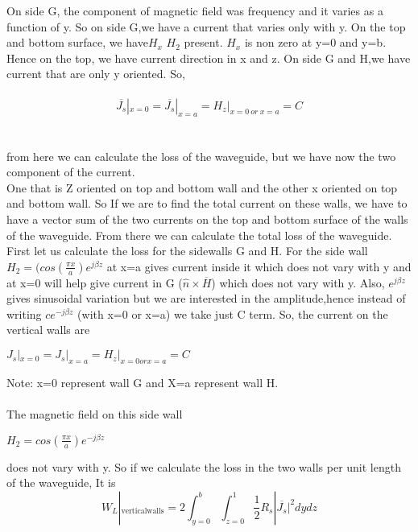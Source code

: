 On side G, the component of magnetic field was frequency and it varies as a function  of y. So on side G,we have a current that varies only with y. On the top and bottom  surface, we have$H_x$ $H_2$ present. 
$H_x$ is non zero at y=0 and y=b.
Hence on the top, we have current direction in x and z.
On side G and H,we have current that are only y oriented. So,\\\\
$$\overline{J_s}|_{x=0} = \overline{J_s}|_{x=a} = H_z|_{x=0 \ or \ x=a}=C$$\\\\
from here we can calculate the loss of the waveguide, but we have now the two component of the current.\\ One that is  Z oriented on top and bottom wall and the other x oriented  on top and bottom  wall. So If we are to find the total current  on these walls, we have to have a vector sum of the two currents on the top and bottom surface of the walls of the waveguide. From there we can calculate the total loss  of the waveguide.
First let us calculate the loss for the sidewalls G and H. 
For the side wall 
$H_2=(cos(\frac{\pi x}{a})e^{j\beta z}$  
at x=a gives current inside it which does not vary with y and at
x=0 will help give current in G ($\hat{n} \times \overline{H}$) which does not vary with y. Also, $e^{j\beta z}$ 
gives sinusoidal variation but we are interested in the amplitude,hence instead of writing $ce^{-j\beta z}$ (with x=0 or x=a) we take just C term. So,
the current  on the vertical  walls are
\begin{center}
	$J_s|_{x=0} = J_s|_{x=a} = H_z|_{x=0 or x=a} = C$	
\end{center}



Note: 
x=0 represent  wall G and
X=a represent wall H.\\\\
The magnetic field on this side wall\\ 
\begin{center}
	$H_2=cos(\frac{\pi x}{a}) e^{-j\beta z}$	
\end{center}



does not vary with y. 
So if we calculate the loss in the two walls per unit length of the waveguide, 
It is
\begin{equation}
W_L|_{\text{verticalwalls}} = 2\int_{y=0}^{b}\int_{z=0}^{1}\frac{1}{2}R_s|\overline{J_s}|^2dydz
\end{equation}


